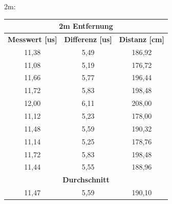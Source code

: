 2m:
\begin{table}[H]
\begin{tabular}{|c|c|c|}
\hline
\multicolumn{3}{|c|}{\textbf{2m Entfernung}}                                         \\ \hline
\textbf{Messwert {[}us{]}} & \textbf{Differenz {[}us{]}} & \textbf{Distanz {[}cm{]}} \\ \hline
11,38                      & 5,49                        & 186,92                    \\ \hline
11,08                      & 5,19                        & 176,72                    \\ \hline
11,66                      & 5,77                        & 196,44                    \\ \hline
11,72                      & 5,83                        & 198,48                    \\ \hline
12,00                      & 6,11                        & 208,00                    \\ \hline
11,12                      & 5,23                        & 178,00                    \\ \hline
11,48                      & 5,59                        & 190,32                    \\ \hline
11,14                      & 5,25                        & 178,76                    \\ \hline
11,72                      & 5,83                        & 198,48                    \\ \hline
11,44                      & 5,55                        & 188,96                    \\ \hline
\multicolumn{3}{|c|}{\textbf{Durchschnitt}}                                          \\ \hline
11,47                      & 5,59                        & 190,10                    \\ \hline
\end{tabular}
\end{table}


